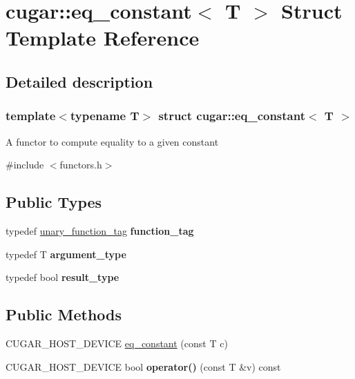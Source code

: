 \hypertarget{structcugar_1_1eq__constant}{}\section{cugar\+:\+:eq\+\_\+constant$<$ T $>$ Struct Template Reference}
\label{structcugar_1_1eq__constant}


\subsection{Detailed description}
\subsubsection*{template$<$typename T$>$\newline
struct cugar\+::eq\+\_\+constant$<$ T $>$}

A functor to compute equality to a given constant 

{\ttfamily \#include $<$functors.\+h$>$}

\subsection*{Public Types}
\begin{DoxyCompactItemize}
\item 
\mbox{\label{structcugar_1_1eq__constant_aeee8e91adb320633a4c3db18b72de5c3}} 
typedef \hyperlink{structcugar_1_1unary__function__tag}{unary\+\_\+function\+\_\+tag} {\bfseries function\+\_\+tag}
\item 
\mbox{\label{structcugar_1_1eq__constant_a721d4a719390cb2d45c68eee6bfc4c50}} 
typedef T {\bfseries argument\+\_\+type}
\item 
\mbox{\label{structcugar_1_1eq__constant_ada81c4bebd6d3937e0ded8a4c61d172a}} 
typedef bool {\bfseries result\+\_\+type}
\end{DoxyCompactItemize}
\subsection*{Public Methods}
\begin{DoxyCompactItemize}
\item 
C\+U\+G\+A\+R\+\_\+\+H\+O\+S\+T\+\_\+\+D\+E\+V\+I\+CE \hyperlink{structcugar_1_1eq__constant_a0686bf3d41fa61faba5c4c231fbc5cc0}{eq\+\_\+constant} (const T c)
\item 
\mbox{\label{structcugar_1_1eq__constant_a281cebc3ca09a5a8b744c6cf99714606}} 
C\+U\+G\+A\+R\+\_\+\+H\+O\+S\+T\+\_\+\+D\+E\+V\+I\+CE bool {\bfseries operator()} (const T \&v) const
\end{DoxyCompactItemize}


